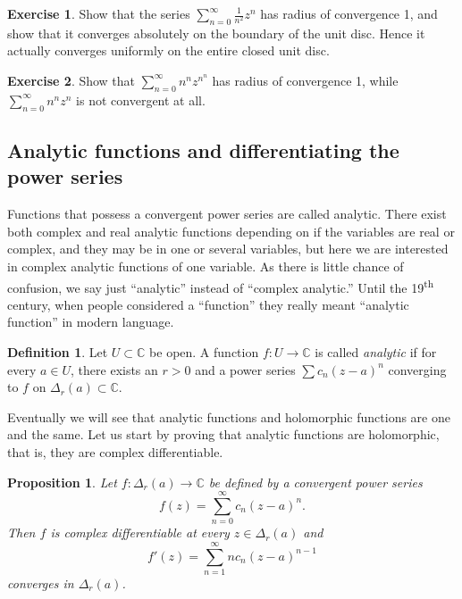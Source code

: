 \documentclass[12pt,openany]{book}
\newcommand{\C}{{\mathbb{C}}}
\newcommand{\myindex}[1]{#1\index{#1}}
\theoremstyle{plain}
\newtheorem{prop}[thm]{Proposition}
\theoremstyle{remark}
\theoremstyle{definition}
\newtheorem{defn}[thm]{Definition}
\newenvironment{exbox}{%
    \def\FrameCommand{\vrule width 1pt \relax\hspace {10pt}}%
    \MakeFramed {\advance \hsize -\width \FrameRestore }%
}{%
    \endMakeFramed
}
\theoremstyle{exercise}
\newtheorem{exercise}{Exercise}[section]
\theoremstyle{example}
\begin{document}
\begin{exbox}
\begin{exercise}
Show that the series $\sum_{n=0}^\infty \frac{1}{n^2} z^{n}$ has radius of convergence 1, and
show that it converges absolutely on the boundary of the unit disc.  Hence
it actually converges uniformly on the entire closed unit disc.
\end{exercise}

\begin{exercise}
Show that
$\sum_{n=0}^\infty n^n z^{n^n}$ has radius of convergence 1,
while
$\sum_{n=0}^\infty n^n z^{n}$ is not convergent at all.
\end{exercise}
\end{exbox}

\subsection{Analytic functions and differentiating the power series}

Functions that possess a convergent power series are called analytic.
There exist both complex and real analytic functions depending on if the
variables are real or complex, and they may be in one or several variables,
but here we are interested in complex analytic functions of one variable. 
As there is little chance of confusion, we say just ``analytic'' instead of
``complex analytic.''  Until the 19\textsuperscript{th} century, 
when people considered a ``function'' they really meant ``analytic function''
in modern language.

\begin{defn}
Let $U \subset \C$ be open.  A function $f \colon U \to \C$
is called \emph{\myindex{analytic}}
if for every $a \in U$, there exists 
an $r > 0$ and a
power series $\sum c_n {(z-a)}^n$ converging to $f$ on $\Delta_r(a) \subset
\C$.
\end{defn}

Eventually we will see that analytic functions and holomorphic functions are
one and the same.  Let us start by proving that
analytic functions are holomorphic, that is, they are complex
differentiable.

\begin{prop}
Let $f \colon \Delta_r(a) \to \C$ be defined by a convergent power series
\begin{equation*}
f(z) = \sum_{n=0}^\infty c_n {(z-a)}^n .
\end{equation*}
Then $f$ is complex differentiable at every $z \in \Delta_r(a)$ and
\begin{equation*}
f'(z) = \sum_{n=1}^\infty n c_n {(z-a)}^{n-1}
\end{equation*}
converges in $\Delta_r(a)$.
\end{prop}
\end{document}

